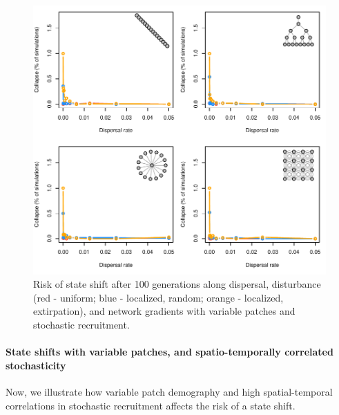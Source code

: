 \documentclass[
]{article}
\begin{document}
\begin{figure}[H]

{\centering \includegraphics{Managing_for_ecological_surprises_in_metapopulations_files/figure-latex/state shift with variable patches and stochasticity-1} 

}

\caption{Risk of state shift after 100 generations along dispersal, disturbance (red - uniform; blue - localized, random; orange - localized, extirpation), and network gradients with variable patches and stochastic recruitment.}\label{fig:state shift with variable patches and stochasticity}
\end{figure}
\newpage

\hypertarget{state-shifts-with-variable-patches-and-spatio-temporally-correlated-stochasticity}{%
\paragraph{State shifts with variable patches, and spatio-temporally
correlated
stochasticity}\label{state-shifts-with-variable-patches-and-spatio-temporally-correlated-stochasticity}}

Now, we illustrate how variable patch demography and high
spatial-temporal correlations in stochastic recruitment affects the risk
of a state shift.
\end{document}
